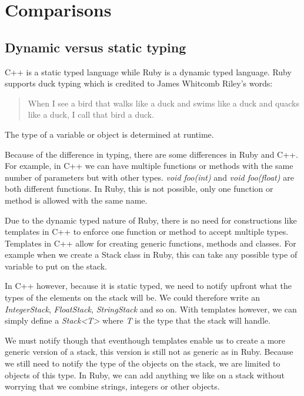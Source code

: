 \documentclass[10pt,a4paper,twocolumn]{article}
\begin{document}
\section{Comparisons}

\subsection{Dynamic versus static typing}
C++ is a static typed language while Ruby is a dynamic typed language. Ruby supports duck typing which is credited to James Whitcomb Riley's words:

\begin{quote}When I see a bird that walks like a duck and swims like a duck and quacks like a duck, I call that bird a duck.\end{quote}

The type of a variable or object is determined at runtime.

Because of the difference in typing, there are some differences in Ruby and C++. For example, in C++ we can have multiple functions or methods with the same number of parameters but with other types. \textit{void foo(int)} and \textit{void foo(float)} are both different functions. In Ruby, this is not possible, only one function or method is allowed with the same name.

Due to the dynamic typed nature of Ruby, there is no need for constructions like templates in C++ to enforce one function or method to accept multiple types. Templates in C++ allow for creating generic functions, methods and classes. For example when we create a Stack class in Ruby, this can take any possible type of variable to put on the stack. 

In C++ however, because it is static typed, we need to notify upfront what the types of the elements on the stack will be. We could therefore write an \textit{IntegerStack}, \textit{FloatStack}, \textit{StringStack} and so on. With templates however, we can simply define a \textit{Stack\textless T\textgreater } where \textit{T} is the type that the stack will handle.

We must notify though that eventhough templates enable us to create a more generic version of a stack, this version is still not as generic as in Ruby. Because we still need to notify the type of the objects on the stack, we are limited to objects of this type. In Ruby, we can add anything we like on a stack without worrying that we combine strings, integers or other objects.
\end{document}
